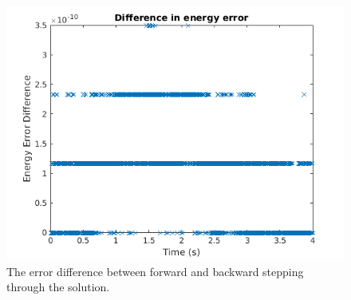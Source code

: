 \documentclass[11pt]{article}
\begin{document}
\begin{figure}[H]
	\centering
	\includegraphics[width=1\textwidth]{../ex3/plots/energyErrorDiff.png}
	\caption{The error difference between forward and backward stepping through the solution.}
	\label{fig:energyErrorDiffHAM}
\end{figure}
\end{document}
